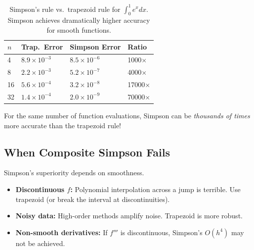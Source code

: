 \begin{table}[ht]
\centering
\begin{tabular}{p{}p{}p{}p{}}
\toprule
$n$ & Trap.\ Error & Simpson Error & Ratio \\
\midrule
4 & $8.9 \times 10^{-3}$ & $8.5 \times 10^{-6}$ & 1000$\times$ \\
8 & $2.2 \times 10^{-3}$ & $5.2 \times 10^{-7}$ & 4000$\times$ \\
16 & $5.6 \times 10^{-4}$ & $3.2 \times 10^{-8}$ & 17000$\times$ \\
32 & $1.4 \times 10^{-4}$ & $2.0 \times 10^{-9}$ & 70000$\times$ \\
\bottomrule
\end{tabular}
\vspace{2em}
\caption{Simpson's rule vs.\ trapezoid rule for $\int_0^1 e^x dx$. Simpson achieves dramatically higher accuracy for smooth functions.}
\label{tab:simpson_vs_trapezoid}
\end{table}


For the same number of function evaluations, Simpson can be \emph{thousands of times} more accurate than the trapezoid rule!


\subsection{When Composite Simpson Fails}

 Simpson's superiority depends on smoothness.

\begin{itemize}
    \item \textbf{Discontinuous $f$:} Polynomial interpolation across a jump is terrible. Use trapezoid (or break the interval at discontinuities).
    \item \textbf{Noisy data:} High-order methods amplify noise. Trapezoid is more robust.
    \item \textbf{Non-smooth derivatives:} If $f'''$ is discontinuous, Simpson's $O(h^4)$ may not be achieved.
\end{itemize}





